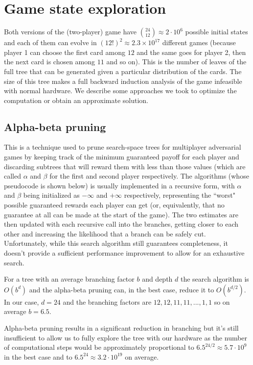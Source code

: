 \documentclass[conference]{IEEEtran}
\begin{document}
\section{Game state exploration}
Both versions of the (two-player) game have ${24 \choose 12} \approx 2\cdot 10^6$ possible initial states and each of them can evolve in $(12!)^2\approx 2.3\times 10^{17}$ different games (because player 1 can choose the first card among $12$ and the same goes for player 2, then the next card is chosen among $11$ and so on). This is the number of leaves of the full tree that can be generated given a particular distribution of the cards. The size of this tree makes a full backward induction analysis of the game infeasible with normal hardware. We describe some approaches we took to optimize the computation or obtain an approximate solution.

\subsection{Alpha-beta pruning}
This is a technique used to prune search-space trees for multiplayer adversarial games by keeping track of the minimum guaranteed payoff for each player and discarding subtrees that will reward them with less than those values (which are called $\alpha$ and $\beta$ for the first and second player respectively.
The algorithms (whose pseudocode is shown below) is usually implemented in a recursive form, with $\alpha$ and $\beta$ being initialized as $-\infty$ and $+\infty$ respectively, representing the ``worst" possible guaranteed rewards each player can get (or, equivalently, that no guarantee at all can be made at the start of the game). The two estimates are then updated with each recursive call into the branches, getting closer to each other and increasing the likelihood that a branch can be safely cut. 
Unfortunately, while this search algorithm still guarantees completeness, it doesn't provide a sufficient performance improvement to allow for an exhaustive search.

For a tree with an average branching factor $b$ and depth $d$ the search algorithm is $O(b^d)$ and the alpha-beta pruning can, in the best case, reduce it to $O(b^{d/2})$. In our case, $d=24$ and the branching factors are $12,12,11,11,...,1,1$ so on average $b=6.5$. 

Alpha-beta pruning results in a significant reduction in branching but it's still insufficient to allow us to fully explore the tree with our hardware as the number of computational steps would be approximately proportional to $6.5^{24/2} \approx 5.7\cdot 10^{9}$ in the best case and to $6.5^{24} \approx 3.2\cdot 10^{19}$ on average.
\end{document}
